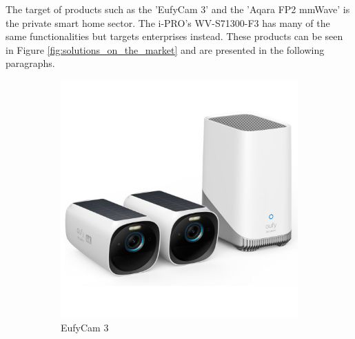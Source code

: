 The target of products such as the 'EufyCam 3' and the 'Aqara FP2 mmWave' is the private smart home sector. The i-PRO's WV-S71300-F3 has many of the same functionalities but targets enterprises instead. These products can be seen in Figure \ref{fig:solutions_on_the_market} and are presented in the following paragraphs.

\begin{figure}[H]
    \centering
    \begin{subfigure}{0.2\textwidth}
        \centering
        \includegraphics[width=\textwidth]{Images/Products/eufycam3.jpg}
        \caption{\centering EufyCam 3}
        \label{fig:eufycam_3}
    \end{subfigure}
    \hspace{30pt}%
    \begin{subfigure}{0.2\textwidth}
        \centering

\end{subfigure}
\end{figure}
